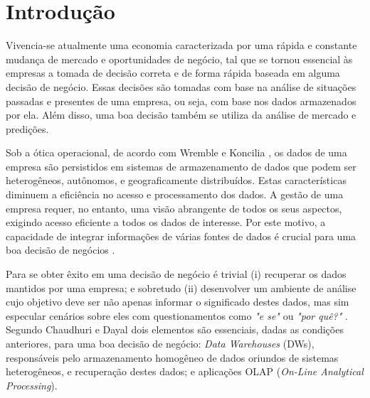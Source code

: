 \chapter{Introdução}
\label{intro}

Vivencia-se atualmente uma economia caracterizada por uma rápida e constante mudança de mercado e oportunidades de negócio, 
tal que se tornou essencial às empresas a tomada de decisão correta e de forma rápida baseada em alguma decisão de negócio. 
Essas decisões são tomadas com base na análise de situações passadas e presentes de uma empresa, ou seja, com base nos dados armazenados por ela. 
Além disso, uma boa decisão também se utiliza da análise de mercado e predições.

Sob a ótica operacional, de acordo com Wremble e Koncilia \cite{wrembel2007data}, os dados de uma empresa são persistidos em sistemas de armazenamento 
de dados que podem ser heterogêneos, autônomos, e geograficamente distribuídos. Estas características diminuem a eficiência no acesso e processamento dos dados. 
A gestão de uma empresa requer, no entanto, uma visão abrangente de todos os seus aspectos, exigindo acesso eficiente a todos os dados de interesse. 
Por este motivo, a capacidade de integrar informações de várias fontes de dados é crucial para uma boa decisão de negócios \cite{wrembel2007data}.

Para se obter êxito em uma decisão de negócio é trivial (i) recuperar os dados mantidos por uma empresa; e sobretudo 
(ii) desenvolver um ambiente de análise cujo objetivo deve ser não apenas informar o significado destes dados, 
mas sim especular cenários sobre eles com questionamentos como \textit{"e se"} ou \textit{"por quê?"} \cite{codd1998providing}. 
Segundo Chaudhuri e Dayal \cite{chaudhuri1997overview} dois elementos são essenciais, dadas as condições anteriores, para uma boa decisão de negócio: 
\textit{Data Warehouses} (DWs), responsáveis pelo armazenamento homogêneo de dados oriundos de sistemas heterogêneos, e recuperação destes dados; 
e aplicações OLAP (\textit{On-Line Analytical Processing}).

